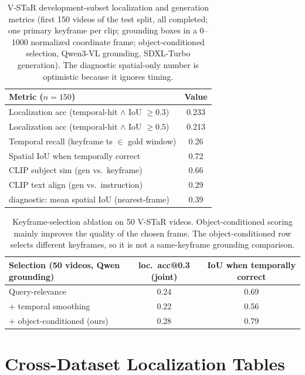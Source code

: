 \documentclass[10pt]{article}
\begin{document}
\begin{table}[htbp]
\centering
\small
\begin{tabular}{lc}
\toprule
Metric ($n=150$) & Value \\
\midrule
Localization acc (temporal-hit $\wedge$ IoU $\ge 0.3$) & 0.233 \\
Localization acc (temporal-hit $\wedge$ IoU $\ge 0.5$) & 0.213 \\
Temporal recall (keyframe ts $\in$ gold window) & 0.26 \\
Spatial IoU when temporally correct & 0.72 \\
CLIP subject sim (gen vs.\ keyframe) & 0.66 \\
CLIP text align (gen vs.\ instruction) & 0.29 \\
diagnostic: mean spatial IoU (nearest-frame) & 0.39 \\
\bottomrule
\end{tabular}
\caption{V-STaR development-subset localization and generation metrics (first 150 videos of the test split, all completed; one primary keyframe per clip; grounding boxes in a 0--1000 normalized coordinate frame; object-conditioned selection, Qwen3-VL grounding, SDXL-Turbo generation). The diagnostic spatial-only number is optimistic because it ignores timing.}
\label{tab:vstar-dev}
\end{table}

\begin{table}[htbp]
\centering
\small
\begin{tabular}{lcc}
\toprule
Selection (50 videos, Qwen grounding) & loc.\ acc@0.3 (joint) & IoU when temporally correct \\
\midrule
Query-relevance & 0.24 & 0.69 \\
+ temporal smoothing & 0.22 & 0.56 \\
+ object-conditioned (ours) & 0.28 & 0.79 \\
\bottomrule
\end{tabular}
\caption{Keyframe-selection ablation on 50 V-STaR videos. Object-conditioned scoring mainly improves the quality of the chosen frame. The object-conditioned row selects different keyframes, so it is not a same-keyframe grounding comparison.}
\label{tab:sel50}
\end{table}

\section{Cross-Dataset Localization Tables}\label{app:cross}
\end{document}
